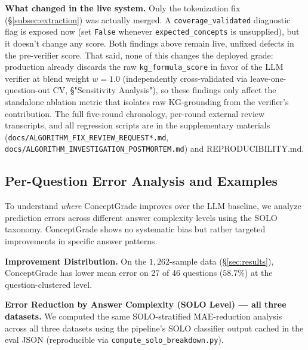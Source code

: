 \documentclass[conference]{IEEEtran}
\begin{document}
\textbf{What changed in the live system.} Only the tokenization fix
(\S\ref{subsec:extraction}) was actually merged. A
\texttt{coverage\_validated} diagnostic flag is exposed now (set
\texttt{False} whenever \texttt{expected\_concepts} is unsupplied),
but it doesn't change any score. Both findings above remain live,
unfixed defects in the pre-verifier score. That said, none of this
changes the deployed grade: production already discards the raw
\texttt{kg\_formula\_score} in favor of the LLM verifier at blend
weight $w=1.0$ (independently cross-validated via
leave-one-question-out CV, \S"Sensitivity Analysis"), so these
findings only affect the standalone ablation metric that isolates raw
KG-grounding from the verifier's contribution. The full five-round
chronology, per-round external review transcripts, and all regression
scripts are in the supplementary materials
(\texttt{docs/ALGORITHM\_FIX\_REVIEW\_REQUEST*.md},
\texttt{docs/ALGORITHM\_INVESTIGATION\_POSTMORTEM.md}) and
REPRODUCIBILITY.md.

\subsection{Per-Question Error Analysis and Examples}

To understand \emph{where} ConceptGrade improves over the LLM baseline, we analyze
prediction errors across different answer complexity levels using the SOLO taxonomy.
ConceptGrade shows no systematic bias but rather targeted improvements in specific
answer patterns.

\textbf{Improvement Distribution.} On the $1{,}262$-sample data
(\S\ref{sec:results}), ConceptGrade has lower mean error on 27 of 46
questions ($58.7\%$) at the question-clustered level.

\textbf{Error Reduction by Answer Complexity (SOLO Level) --- all three datasets.}
We computed the same SOLO-stratified MAE-reduction analysis across all three
datasets using the pipeline's SOLO classifier output cached in the eval JSON
(reproducible via \texttt{compute\_solo\_breakdown.py}).
\end{document}
